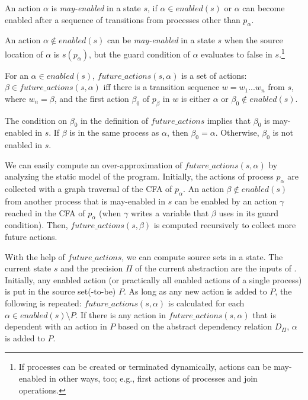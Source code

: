 \documentclass[numbook]{svjour3}
\begin{document}
\begin{definition}
	An action $\alpha$ is \emph{may-enabled} in a state $s$, if $\alpha \in \mathit{enabled}(s)$ or $\alpha$ can become enabled after a sequence of transitions from processes other than $p_\alpha$.
\end{definition}

An action $\alpha \notin \mathit{enabled}(s)$ can be \emph{may-enabled} in a state $s$ when the source location of $\alpha$ is $s(p_\alpha)$, but the guard condition of $\alpha$ evaluates to false in $s$.\footnote{If processes can be created or terminated dynamically, actions can be may-enabled in other ways, too; e.g., first actions of processes and join operations.}

\begin{definition}
	For an $\alpha \in {enabled}(s)$, $\mathit{future\_actions}(s, \alpha)$ is a set of actions: $\beta \in \mathit{future\_actions}(s, \alpha)$ iff there is a transition sequence $w = w_1...w_n$ from $s$, where $w_n = \beta$, and the first action $\beta_0$ of $p_\beta$ in $w$ is either $\alpha$ or $\beta_0 \notin \mathit{enabled}(s)$.
\end{definition}

The condition on $\beta_0$ in the definition of $\mathit{future\_actions}$ implies that $\beta_0$ is may-enabled in $s$. If $\beta$ is in the same process as $\alpha$, then $\beta_0 = \alpha$. Otherwise, $\beta_0$ is not enabled in $s$.

We can easily compute an over-approximation of $\mathit{future\_actions}(s, \alpha)$ by analyzing the static model of the program. Initially, the actions of process $p_\alpha$ are collected with a graph traversal of the CFA of $p_\alpha$. An action $\beta \notin {enabled}(s)$ from another process that is may-enabled in $s$ can be enabled by an action $\gamma$ reached in the CFA of $p_\alpha$ (when $\gamma$ writes a variable that $\beta$ uses in its guard condition). Then, $\mathit{future\_actions}(s, \beta)$ is computed recursively to collect more future actions.

With the help of $\mathit{future\_actions}$, we can compute source sets in a state. The current state $s$ and the precision $\Pi$ of the current abstraction are the inputs of . Initially, any enabled action (or practically all enabled actions of a single process) is put in the source set(-to-be) $P$. As long as any new action is added to $P$, the following is repeated: $\mathit{future\_actions}(s, \alpha)$ is calculated for each $\alpha \in {enabled}(s) \setminus P$. If there is any action in $\mathit{future\_actions}(s, \alpha)$ that is dependent with an action in $P$ based on the abstract dependency relation $D_\Pi$, $\alpha$ is added to $P$.
\end{document}
